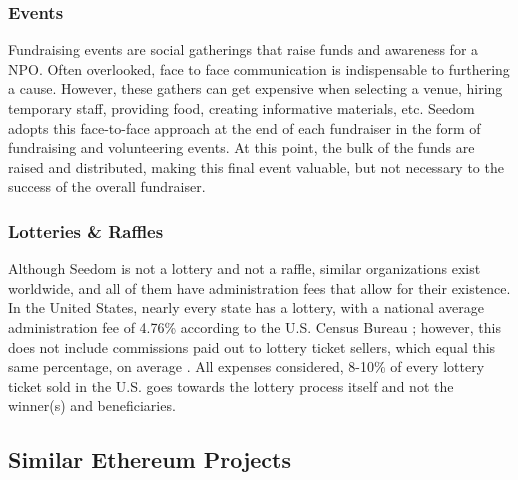 \documentclass[11pt]{article}
\begin{document}
\subsubsection{Events}

Fundraising events are social gatherings that raise funds and awareness for a NPO. Often overlooked, face to face communication is indispensable to furthering a cause. However, these gathers can get expensive when selecting a venue, hiring temporary staff, providing food, creating informative materials, etc. Seedom adopts this face-to-face approach at the end of each fundraiser in the form of fundraising and volunteering events. At this point, the bulk of the funds are raised and distributed, making this final event valuable, but not necessary to the success of the overall fundraiser.

\subsubsection{Lotteries \& Raffles}

Although Seedom is not a lottery and not a raffle, similar organizations exist worldwide, and all of them have administration fees that allow for their existence. In the United States, nearly every state has a lottery, with a national average administration fee of 4.76\% according to the U.S. Census Bureau \cite{3}; however, this does not include commissions paid out to lottery ticket sellers, which equal this same percentage, on average \cite{4}. All expenses considered, 8-10\% of every lottery ticket sold in the U.S. goes towards the lottery process itself and not the winner(s) and beneficiaries.

\subsection{Similar Ethereum Projects}
\end{document}
